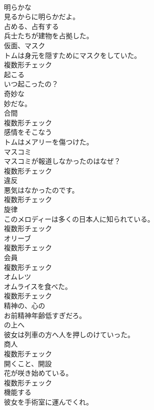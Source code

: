 \documentclass[8pt]{extreport}
\begin{document}
\begin{CJK}{UTF8}{min}
\\	[形容詞]	明らかな	
\\	見るからに明らかだよ。	
\\	[動詞]	占める、占有する	
\\	兵士たちが建物を占拠した。	
\\	[名詞]	仮面、マスク	
\\	トムは身元を隠すためにマスクをしていた。	
\\	複数形チェック
\\	[動詞]	起こる	
\\	いつ起こったの？	
\\	[形容詞]	奇妙な	
\\	妙だな。	
\\	[名詞]	合間	
\\	複数形チェック
\\	[動詞]	感情をそこなう	
\\	トムはメアリーを傷つけた。	
\\	[名詞]	マスコミ	
\\	マスコミが報道しなかったのはなぜ？	
\\	複数形チェック
\\	[名詞]	違反	
\\	悪気はなかったのです。	
\\	複数形チェック
\\	[名詞]	旋律	
\\	このメロディーは多くの日本人に知られている。	
\\	複数形チェック
\\	[名詞]	オリーブ	
\\	複数形チェック
\\	[名詞]	会員	
\\	複数形チェック
\\	[名詞]	オムレツ	
\\	オムライスを食べた。	
\\	複数形チェック
\\	[形容詞]	精神の、心の	
\\	お前精神年齢低すぎだろ。	
\\	[前置詞]	の上へ	
\\	彼女は列車の方へ人を押しのけていった。	
\\	[名詞]	商人	
\\	複数形チェック
\\	[名詞]	開くこと、開設	
\\	花が咲き始めている。	
\\	複数形チェック
\\	[動詞]	機能する	
\\	彼女を手術室に運んでくれ。	

\end{CJK}
\end{document}
